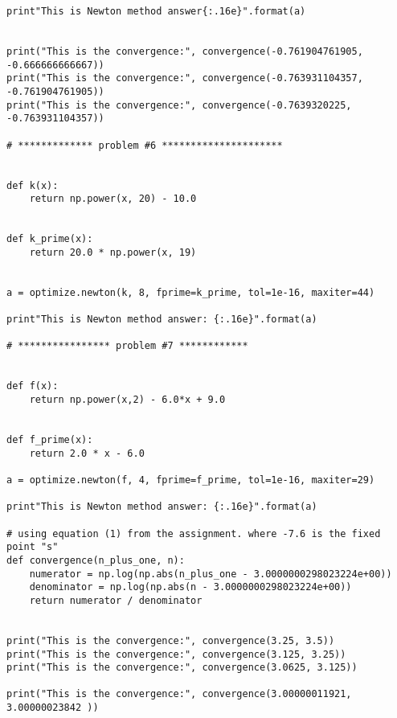 \documentclass[12pt letterpaper]{article}
\begin{document}
\begin{verbatim}
print"This is Newton method answer{:.16e}".format(a)


print("This is the convergence:", convergence(-0.761904761905, -0.666666666667))
print("This is the convergence:", convergence(-0.763931104357, -0.761904761905))
print("This is the convergence:", convergence(-0.7639320225, -0.763931104357))

# ************* problem #6 *********************


def k(x):
    return np.power(x, 20) - 10.0


def k_prime(x):
    return 20.0 * np.power(x, 19)


a = optimize.newton(k, 8, fprime=k_prime, tol=1e-16, maxiter=44)

print"This is Newton method answer: {:.16e}".format(a)

# **************** problem #7 ************


def f(x):
    return np.power(x,2) - 6.0*x + 9.0


def f_prime(x):
    return 2.0 * x - 6.0

a = optimize.newton(f, 4, fprime=f_prime, tol=1e-16, maxiter=29)

print"This is Newton method answer: {:.16e}".format(a)

# using equation (1) from the assignment. where -7.6 is the fixed point "s"
def convergence(n_plus_one, n):  
    numerator = np.log(np.abs(n_plus_one - 3.0000000298023224e+00))
    denominator = np.log(np.abs(n - 3.0000000298023224e+00))
    return numerator / denominator


print("This is the convergence:", convergence(3.25, 3.5))
print("This is the convergence:", convergence(3.125, 3.25))
print("This is the convergence:", convergence(3.0625, 3.125))

print("This is the convergence:", convergence(3.00000011921, 3.00000023842 ))


\end{verbatim}
\end{document}

